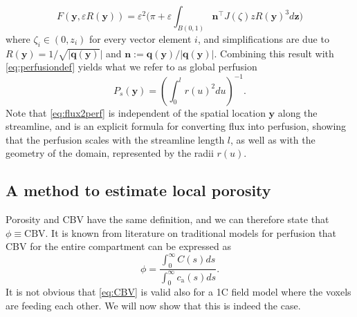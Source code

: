 \documentclass[10pt]{article}
\begin{document}
	\begin{equation}
		F(\mathbf{y},\varepsilon R(\mathbf{y}))
		= \varepsilon^2 \Big(\pi + \varepsilon \int_{B(0,1)} \mathbf{n}^\top J(\zeta)zR(\mathbf{y})^3 d \mathbf{z} \Big)
	\end{equation}
	where $\zeta_i \in (0,z_i)$ for every vector element $i$, and simplifications are due to $R(\mathbf{y}) = 1/\sqrt{\vert \mathbf{q}(\mathbf{y})} \vert$ and $\mathbf{n}:=\mathbf{q}(\mathbf{y})/\vert \mathbf{q}(\mathbf{y}) \vert$.
	Combining this result with \eqref{eq:perfusiondef} yields what we refer to as global perfusion
	\begin{equation}\label{eq:flux2perf}
		P_s(\mathbf{y}) = \left(\int_0^l r(u)^2 d u\right)^{-1}.
	\end{equation}
	Note that \eqref{eq:flux2perf} is independent of the spatial location $\mathbf{y}$ along the streamline, and is an explicit formula for converting flux into perfusion, showing that the perfusion scales with the streamline length $l$, as well as with the geometry of the domain, represented by the radii $r(u)$.


	\subsection{A method to estimate local porosity}\label{sec:CBV}

	Porosity and CBV have the same definition, and we can therefore state that $\phi \equiv \mathrm{CBV}$. It is known from literature on traditional models \cite{sourbron13} for perfusion that CBV for the entire compartment can be expressed as
	\begin{equation}
		\phi = \frac{\int_0^\infty C(s) d s}{\int_0^\infty c_\mathrm{a}(s) d s}.
		\label{eq:CBV}
	\end{equation}
	It is not obvious that \eqref{eq:CBV} is valid also for a 1C field model where the voxels are feeding each other. 
	We will now show that this is indeed the case.
	
\end{document}
